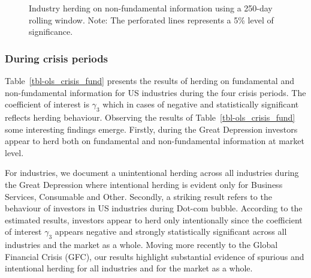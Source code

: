 \documentclass[
  letterpaper,
  DIV=11,
  numbers=noendperiod]{scrartcl}
\begin{document}
\begin{figure}[H]


\caption{\label{fig-rol_nonfundamental}Industry herding on
non-fundamental information using a 250-day rolling window. Note: The
perforated lines represents a 5\% level of significance.}

\end{figure}%

\subsubsection{During crisis periods}\label{during-crisis-periods}

Table~\ref{tbl-ols_crisis_fund} presents the results of herding on
fundamental and non-fundamental information for US industries during the
four crisis periods. The coefficient of interest is \(\gamma_3\) which
in cases of negative and statistically significant reflects herding
behaviour. Observing the results of Table~\ref{tbl-ols_crisis_fund} some
interesting findings emerge. Firstly, during the Great Depression
investors appear to herd both on fundamental and non-fundamental
information at market level.

For industries, we document a unintentional herding across all
industries during the Great Depression where intentional herding is
evident only for Business Services, Consumable and Other. Secondly, a
striking result refers to the behaviour of investors in US industries
during Dot-com bubble. According to the estimated results, investors
appear to herd only intentionally since the coefficient of interest
\(\gamma_3\) appears negative and strongly statistically significant
across all industries and the market as a whole. Moving more recently to
the Global Financial Crisis (GFC), our results highlight substantial
evidence of spurious and intentional herding for all industries and for
the market as a whole.
\end{document}
